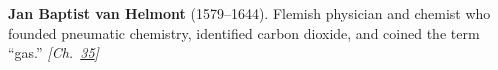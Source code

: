 \textbf{Jan Baptist van Helmont} (1579–1644). Flemish physician and chemist who founded pneumatic chemistry, identified carbon dioxide, and coined the term ``gas.'' \emph{[Ch.~\hyperref[ch:treesfromair]{35}]}

